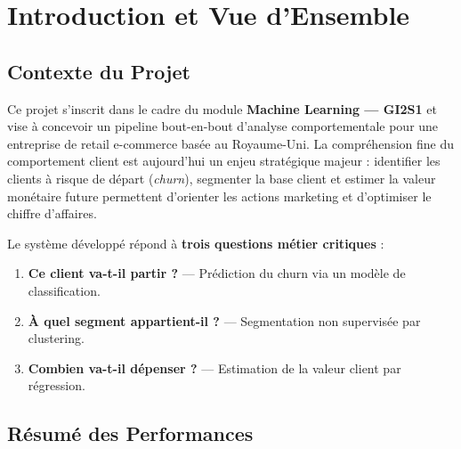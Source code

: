 \documentclass[12pt,a4paper]{article}
\begin{document}
\tableofcontents
\newpage

\section{Introduction et Vue d'Ensemble}

\subsection{Contexte du Projet}

Ce projet s'inscrit dans le cadre du module \textbf{Machine Learning — GI2S1} et vise à
concevoir un pipeline bout-en-bout d'analyse comportementale pour une entreprise de retail
e-commerce basée au Royaume-Uni. La compréhension fine du comportement client est aujourd'hui
un enjeu stratégique majeur : identifier les clients à risque de départ (\textit{churn}),
segmenter la base client et estimer la valeur monétaire future permettent d'orienter
les actions marketing et d'optimiser le chiffre d'affaires.

Le système développé répond à \textbf{trois questions métier critiques} :

\begin{enumerate}[label=\textbf{Q\arabic*.}]
  \item \textbf{Ce client va-t-il partir ?} — Prédiction du churn via un modèle de classification.
  \item \textbf{À quel segment appartient-il ?} — Segmentation non supervisée par clustering.
  \item \textbf{Combien va-t-il dépenser ?} — Estimation de la valeur client par régression.
\end{enumerate}

\subsection{Résumé des Performances}
\end{document}

